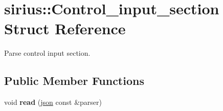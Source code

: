 \hypertarget{structsirius_1_1_control__input__section}{}\section{sirius\+:\+:Control\+\_\+input\+\_\+section Struct Reference}
\label{structsirius_1_1_control__input__section}


Parse control input section.  


\subsection*{Public Member Functions}
\begin{DoxyCompactItemize}
\item 
\hypertarget{structsirius_1_1_control__input__section_a0cd3a15c39d466554f4d8f74e1014abe}{}void {\bfseries read} (\hyperlink{classnlohmann_1_1basic__json}{json} const \&parser)\label{structsirius_1_1_control__input__section_a0cd3a15c39d466554f4d8f74e1014abe}

\end{DoxyCompactItemize}
